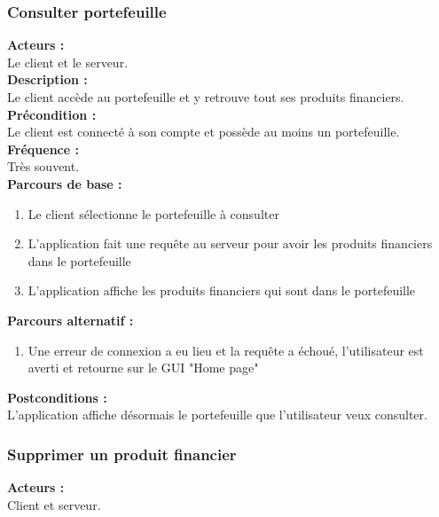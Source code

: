 \documentclass[../rapport.tex]{subfiles}
\begin{document}
\subsubsection{Consulter portefeuille}

\textbf{Acteurs :} \\
Le client et le serveur. \\

\textbf{Description :} \\
Le client accède au portefeuille et y retrouve tout ses produits financiers. \\

\textbf{Précondition :} \\
Le client est connecté à son compte et possède au moins un portefeuille. \\

\textbf{Fréquence :} \\
Très souvent. \\

\textbf{Parcours de base :} \\
\begin{enumerate}
    \item Le client sélectionne le portefeuille à consulter
    \item L'application fait une requête au serveur pour avoir les produits financiers dans le portefeuille
    \item L'application affiche les produits financiers qui sont dans le portefeuille
\end{enumerate}
\bigskip

\textbf{Parcours alternatif :}
\begin{enumerate}
    \item Une erreur de connexion a eu lieu et la requête a échoué, l'utilisateur est averti et retourne sur le GUI "Home page"
\end{enumerate}

\textbf{Postconditions :} \\
L'application affiche désormais le portefeuille que l'utilisateur veux consulter. \\



\subsubsection{Supprimer un produit financier}

\textbf{Acteurs :} \\
Client et serveur. \\
\end{document}
